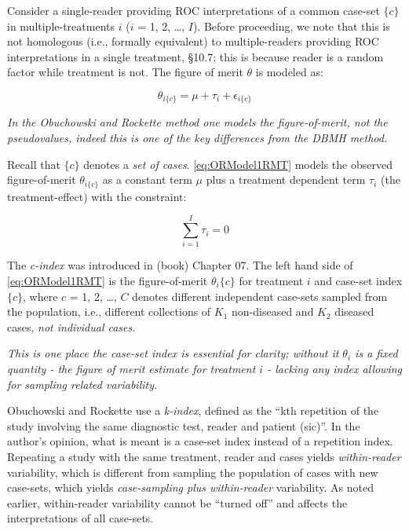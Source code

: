 \documentclass[
]{book}
\begin{document}
Consider a single-reader providing ROC interpretations of a common case-set \(\{c\}\) in multiple-treatments \(i\) (\(i\) = 1, 2, \ldots, \(I\)). Before proceeding, we note that this is not homologous (i.e., formally equivalent) to multiple-readers providing ROC interpretations in a single treatment, §10.7; this is because reader is a random factor while treatment is not. The figure of merit \(\theta\) is modeled as:

\begin{equation}
\theta_{i\{c\}}=\mu+\tau_i+\epsilon_{i\{c\}}
\label{eq:ORModel1RMT}
\end{equation}

\emph{In the Obuchowski and Rockette method \citep{RN1450} one models the figure-of-merit, not the pseudovalues, indeed this is one of the key differences from the DBMH method.}

Recall that \(\{c\}\) denotes a \emph{set of cases}. \eqref{eq:ORModel1RMT} models the observed figure-of-merit \(\theta_{i\{c\}}\) as a constant term \(\mu\) plus a treatment dependent term \(\tau_i\) (the treatment-effect) with the constraint:

\begin{equation}
\sum_{i=1}^{I}\tau_i=0
\label{eq:ConstraintTau}
\end{equation}

The \emph{c-index} was introduced in (book) Chapter 07. The left hand side of \eqref{eq:ORModel1RMT} is the figure-of-merit \(\theta_i\{c\}\) for treatment \(i\) and case-set index \(\{c\}\), where \(c\) = 1, 2, \ldots, \(C\) denotes different independent case-sets sampled from the population, i.e., different collections of \(K_1\) non-diseased and \(K_2\) diseased cases, \emph{not individual cases}.

\emph{This is one place the case-set index is essential for clarity; without it \(\theta_i\) is a fixed quantity - the figure of merit estimate for treatment \(i\) - lacking any index allowing for sampling related variability.}

Obuchowski and Rockette use a \emph{k-index}, defined as the ``kth repetition of the study involving the same diagnostic test, reader and patient (sic)''. In the author's opinion, what is meant is a case-set index instead of a repetition index. Repeating a study with the same treatment, reader and cases yields \emph{within-reader} variability, which is different from sampling the population of cases with new case-sets, which yields \emph{case-sampling plus within-reader} variability. As noted earlier, within-reader variability cannot be ``turned off'' and affects the interpretations of all case-sets.
\end{document}
